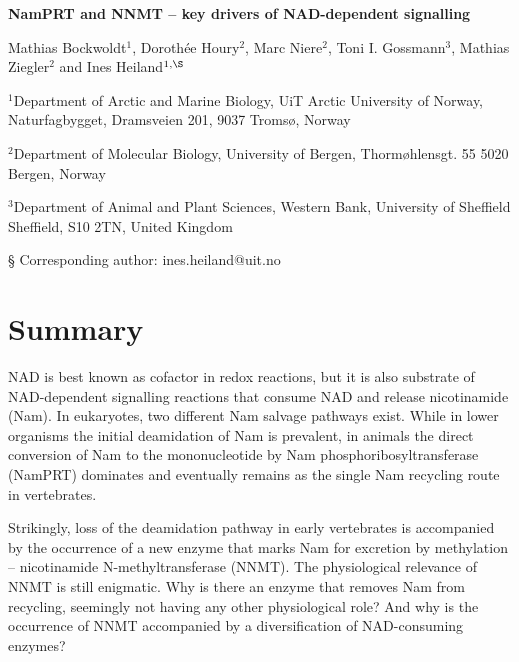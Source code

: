 \documentclass[paper=a4, 12pt]{scrartcl}
\begin{document}
\noindent
{\huge\sffamily\bfseries NamPRT and NNMT – key drivers of NAD-dependent signalling \par}

\vspace{2cm}

\noindent
Mathias Bockwoldt$^{1}$, Dorothée Houry$^{2}$,  Marc Niere$^{2}$, Toni I. Gossmann$^{3}$, Mathias Ziegler$^{2}$ and Ines Heiland$^{1,\S}$

\vspace{1cm}

\noindent
$^{1}$Department of Arctic and Marine Biology, UiT Arctic University of Norway, Naturfagbygget, Dramsveien 201, 9037 Tromsø, Norway

\noindent
$^{2}$Department of Molecular Biology, University of Bergen, Thormøhlensgt. 55
5020 Bergen, Norway

\noindent
$^{3}$Department of Animal and Plant Sciences, Western Bank, University of Sheffield
Sheffield, S10 2TN, United Kingdom

\noindent
§ Corresponding author: ines.heiland@uit.no


\section{Summary}

NAD is best known as cofactor in redox reactions, but it is also substrate of NAD-dependent signalling reactions that consume NAD and release nicotinamide (Nam). In eukaryotes, two different Nam salvage pathways exist. While in lower organisms the initial deamidation of Nam is prevalent, in animals the direct conversion of Nam to the mononucleotide by Nam phosphoribosyltransferase (NamPRT) dominates and eventually remains as the single Nam recycling route in vertebrates.

Strikingly, loss of the deamidation pathway in early vertebrates is accompanied by the occurrence of a new enzyme that marks Nam for excretion by methylation – nicotinamide N-methyltransferase (NNMT). The physiological relevance of NNMT is still enigmatic. Why is there an enzyme that removes Nam from recycling, seemingly not having any other physiological role? And why is the occurrence of NNMT accompanied by a diversification of NAD-consuming enzymes?
\end{document}
